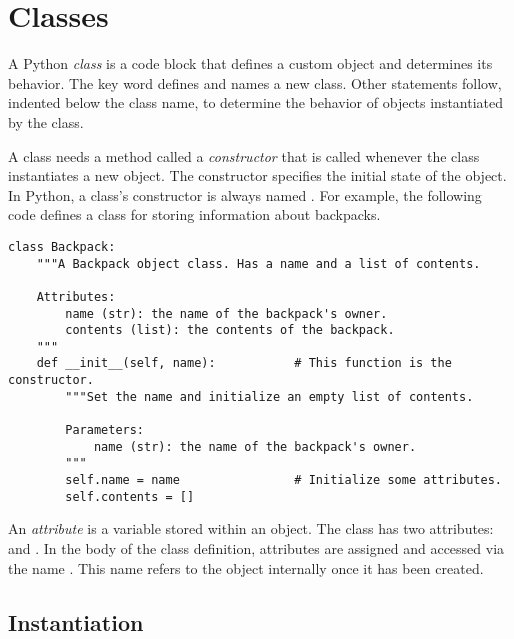 \label{lab:OOP}

\section*{Classes} %

A Python \emph{class} is a code block that defines a custom object and determines its behavior.
The  key word defines and names a new class.
Other statements follow, indented below the class name, to determine the behavior of objects instantiated by the class.

A class needs a method called a \emph{constructor} that is called whenever the class instantiates a new object.
The constructor specifies the initial state of the object.
In Python, a class's constructor is always named .
For example, the following code defines a class for storing information about backpacks.

\begin{lstlisting}
class Backpack:
    """A Backpack object class. Has a name and a list of contents.

    Attributes:
        name (str): the name of the backpack's owner.
        contents (list): the contents of the backpack.
    """
    def __init__(self, name):           # This function is the constructor.
        """Set the name and initialize an empty list of contents.

        Parameters:
            name (str): the name of the backpack's owner.
        """
        self.name = name                # Initialize some attributes.
        self.contents = []
\end{lstlisting}

An \emph{attribute} is a variable stored within an object.
The  class has two attributes:  and .
In the body of the class definition, attributes are assigned and accessed via the name .
This name refers to the object internally once it has been created.

\subsection*{Instantiation} %

